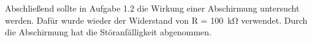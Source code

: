\documentclass{article}						%
\begin{document}
		\begin{figure}[h!]
		\end{figure}
		
		Abschließend sollte in Aufgabe 1.2 die Wirkung einer Abschirmung untersucht werden. Dafür wurde wieder der Widerstand von R = \SI{100}{\kilo\ohm} verwendet. Durch die Abschirmung hat die Störanfälligkeit abgenommen. 
		
\end{document}
